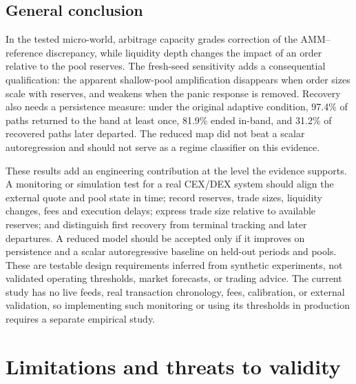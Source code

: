 \begin{samepage}
\section{General conclusion}

In the tested micro-world, arbitrage capacity grades correction of the AMM–reference discrepancy, while liquidity depth changes the impact of an order relative to the pool reserves. The fresh-seed sensitivity adds a consequential qualification: the apparent shallow-pool amplification disappears when order sizes scale with reserves, and weakens when the panic response is removed. Recovery also needs a persistence measure: under the original adaptive condition, 97.4\% of paths returned to the band at least once, 81.9\% ended in-band, and 31.2\% of recovered paths later departed. The reduced map did not beat a scalar autoregression and should not serve as a regime classifier on this evidence.

These results add an engineering contribution at the level the evidence supports. A monitoring or simulation test for a real CEX/DEX system should align the external quote and pool state in time; record reserves, trade sizes, liquidity changes, fees and execution delays; express trade size relative to available reserves; and distinguish first recovery from terminal tracking and later departures. A reduced model should be accepted only if it improves on persistence and a scalar autoregressive baseline on held-out periods and pools. These are testable design requirements inferred from synthetic experiments, not validated operating thresholds, market forecasts, or trading advice. The current study has no live feeds, real transaction chronology, fees, calibration, or external validation, so implementing such monitoring or using its thresholds in production requires a separate empirical study.

\end{samepage}

\section{Limitations and threats to validity}


